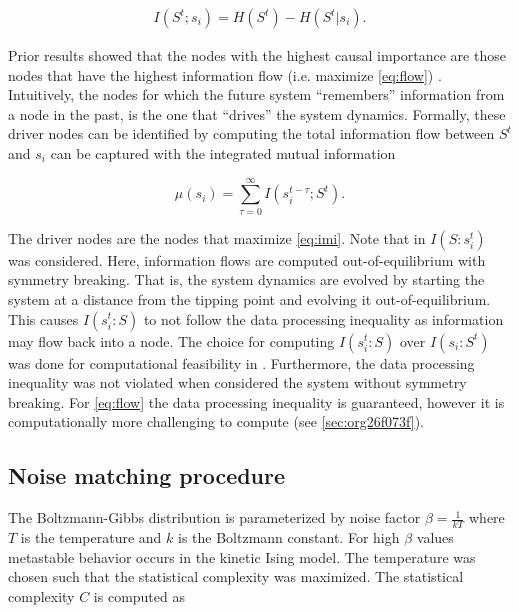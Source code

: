\documentclass[a4paper, 11pt, twocolumn]{article}
\begin{document}
\begin{equation}
\label{eq:flow}
\begin{aligned}
I(S^t; s_i) = H(S^t) - H(S^t | s_i).
\end{aligned}
\end{equation}


Prior results showed that the  nodes with the highest causal
importance are those nodes that have the highest information
flow   (i.e.   maximize  \ref{eq:flow})   \cite{vanElteren2022}.
Intuitively,  the   nodes  for   which  the   future  system
``remembers'' information from a node  in the past, is the one
that ``drives''  the system  dynamics. Formally,  these driver
nodes can  be identified by computing  the total information
flow  between  $S^t$ and  $s_i$  can  be captured  with  the
integrated mutual information \cite{vanElteren2021}

\begin{equation}
\label{eq:imi}
\mu(s_i) = \sum_{\tau = 0}^{\infty} I(s_{i}^{t-\tau} ; S^t).
\end{equation}

The  driver nodes  are the  nodes that  maximize \ref{eq:imi}.
Note  that  in  \cite{vanElteren2022}  $I(S  :  s_i^{t})$  was
considered.   Here,    information   flows    are   computed
out-of-equilibrium  with  symmetry  breaking. That  is,  the
system  dynamics are  evolved by  starting the  system at  a
distance   from   the   tipping  point   and   evolving   it
out-of-equilibrium. This causes $I(s_i^t : S)$ to not follow
the data processing inequality  as information may flow back
into a  node. The choice  for computing $I(s_i^t :  S)$ over
$I(s_i  : S^t)$  was done  for computational  feasibility in
\cite{vanElteren2022}.   Furthermore,   the  data   processing
inequality  was  not  violated when  considered  the  system
without   symmetry  breaking.   For  \ref{eq:flow}   the  data
processing   inequality  is   guaranteed,   however  it   is
computationally more challenging to compute (see \ref{sec:org26f073f}).
\subsection{Noise matching procedure}
\label{sec:org11ee4e3}
The Boltzmann-Gibbs  distribution is parameterized  by noise
factor $\beta =  \frac{1}{kT}$ where $T$ is  the temperature and
$k$  is   the  Boltzmann  constant.  For   high  $\beta$  values
metastable behavior  occurs in the kinetic  Ising model. The
temperature was chosen such  that the statistical complexity
\cite{Lopez-Ruiz1995a}   was    maximized.   The   statistical
complexity $C$ is computed as
\end{document}
